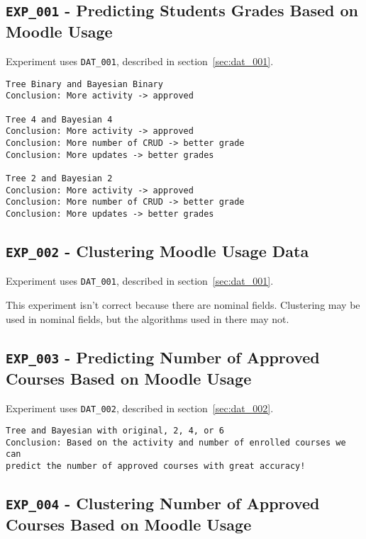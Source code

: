 \subsection{\texttt{EXP\_001} - Predicting Students Grades Based on Moodle
Usage}

Experiment uses \texttt{DAT\_001}, described in section~\ref{sec:dat_001}.

\begin{verbatim}
Tree Binary and Bayesian Binary
Conclusion: More activity -> approved

Tree 4 and Bayesian 4
Conclusion: More activity -> approved
Conclusion: More number of CRUD -> better grade
Conclusion: More updates -> better grades

Tree 2 and Bayesian 2
Conclusion: More activity -> approved
Conclusion: More number of CRUD -> better grade
Conclusion: More updates -> better grades
\end{verbatim}

\subsection{\texttt{EXP\_002} - Clustering Moodle Usage Data}

Experiment uses \texttt{DAT\_001}, described in section~\ref{sec:dat_001}.

This experiment isn't correct because there are nominal fields. Clustering may
be used in nominal fields, but the algorithms used in there may not.

\subsection{\texttt{EXP\_003} - Predicting Number of Approved Courses Based on
Moodle Usage}

Experiment uses \texttt{DAT\_002}, described in section~\ref{sec:dat_002}.

\begin{verbatim}
Tree and Bayesian with original, 2, 4, or 6
Conclusion: Based on the activity and number of enrolled courses we can
predict the number of approved courses with great accuracy!
\end{verbatim}

\subsection{\texttt{EXP\_004} - Clustering Number of Approved Courses Based on
Moodle Usage}


